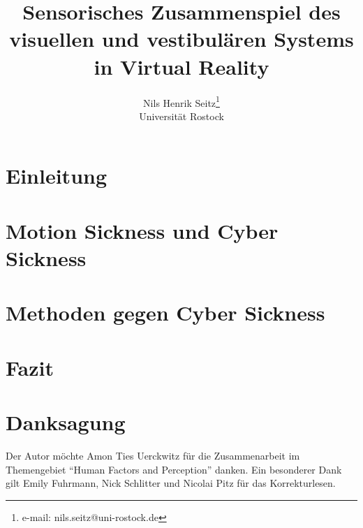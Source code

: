 \documentclass[preprint]{vgtc}               %
\title{Sensorisches Zusammenspiel des visuellen und vestibul\"aren Systems in Virtual Reality}
\author{Nils Henrik Seitz\thanks{e-mail: nils.seitz@uni-rostock.de}\\ \scriptsize Universit\"at Rostock}
\begin{document}
\maketitle
\section{Einleitung} 
	
	
\section{Motion Sickness und Cyber Sickness}
	
	 
\section{Methoden gegen Cyber Sickness}\label{Maßnahmen gegen CS}
	

\section{Fazit}
	

\section*{Danksagung}{
	Der Autor m\"ochte Amon Ties Uerckwitz f\"ur die Zusammenarbeit im Themengebiet "`Human Factors and Perception"' danken. Ein besonderer Dank gilt Emily Fuhrmann, Nick Schlitter und Nicolai Pitz f\"ur das Korrekturlesen.}




\end{document}
